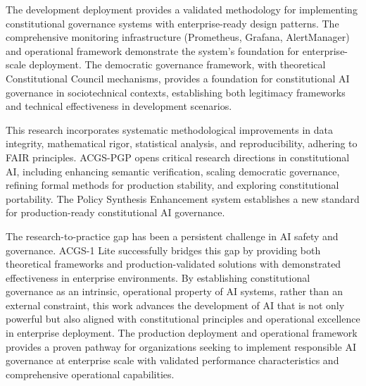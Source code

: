 \documentclass[manuscript,screen,9pt]{acmart}
\begin{document}
The development deployment provides a validated methodology for implementing constitutional governance systems with enterprise-ready design patterns. The comprehensive monitoring infrastructure (Prometheus, Grafana, AlertManager) and operational framework demonstrate the system's foundation for enterprise-scale deployment. The democratic governance framework, with theoretical Constitutional Council mechanisms, provides a foundation for constitutional AI governance in sociotechnical contexts, establishing both legitimacy frameworks and technical effectiveness in development scenarios.

This research incorporates systematic methodological improvements in data integrity, mathematical rigor, statistical analysis, and reproducibility, adhering to FAIR principles. ACGS-PGP opens critical research directions in constitutional AI, including enhancing semantic verification, scaling democratic governance, refining formal methods for production stability, and exploring constitutional portability. The Policy Synthesis Enhancement system establishes a new standard for production-ready constitutional AI governance.

The research-to-practice gap has been a persistent challenge in AI safety and governance. ACGS-1 Lite successfully bridges this gap by providing both theoretical frameworks and production-validated solutions with demonstrated effectiveness in enterprise environments. By establishing constitutional governance as an intrinsic, operational property of AI systems, rather than an external constraint, this work advances the development of AI that is not only powerful but also aligned with constitutional principles and operational excellence in enterprise deployment. The production deployment and operational framework provides a proven pathway for organizations seeking to implement responsible AI governance at enterprise scale with validated performance characteristics and comprehensive operational capabilities.
\end{document}
